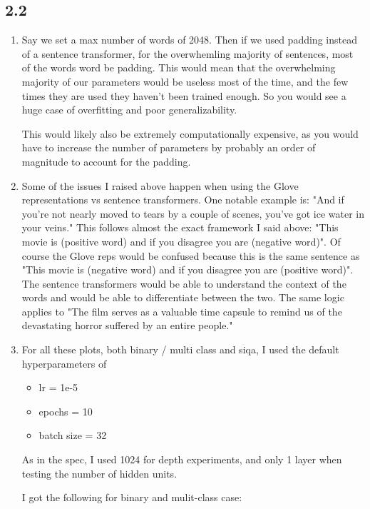 \documentclass[12pt]{article}
\theoremstyle{definitionstyle}
\begin{document}
    \subsection*{2.2}
    \begin{enumerate}
        \item Say we set a max number of words of 2048. Then if we used padding instead of a sentence transformer, for the overwhemling majority of sentences, most of the words word be padding. This would mean that the overwhelming majority of our parameters would be useless most of the time, and the few times they are used they haven't been trained enough. So you would see a huge case of overfitting and poor generalizability. 

        This would likely also be extremely computationally expensive, as you would have to increase the number of parameters by probably an order of magnitude to account for the padding.

        \item Some of the issues I raised above happen when using the Glove representations vs sentence transformers. One notable example is: "And if you're not nearly moved to tears by a couple of scenes, you've got ice water in your veins." This follows almost the exact framework I said above: "This movie is (positive word) and if you disagree you are (negative word)". Of course the Glove reps would be confused because this is the same sentence as "This movie is (negative word) and if you disagree you are (positive word)". The sentence transformers would be able to understand the context of the words and would be able to differentiate between the two. The same logic applies to "The film serves as a valuable time capsule to remind us of the devastating horror suffered by an entire people." 

        \newpage
        \item

        For all these plots, both binary / multi class and siqa, I used the default hyperparameters of 
        \begin{itemize}
            \item lr = 1e-5
            \item epochs = 10
            \item batch size = 32
        \end{itemize}
        As in the spec, I used 1024 for depth experiments, and only 1 layer when testing the number of hidden units. 

        I got the following for binary and mulit-class case:


\end{enumerate}
\end{document}
